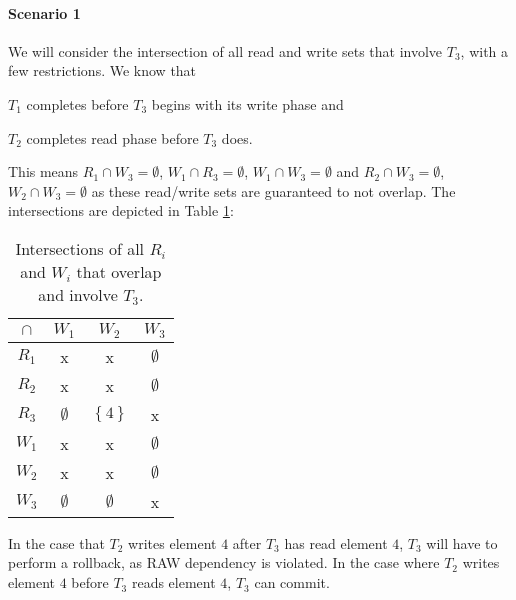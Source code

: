 \documentclass[11pt,a4paper,english]{article}
\begin{document}
\paragraph{Scenario 1}
We will consider the intersection of all read and write sets that involve
$T_{3}$, with a few restrictions. We know that \begin{inparaenum}[1)] \item
  $T_{1}$ completes before
$T_{3}$ begins with its write phase and \item $T_{2}$ completes read phase before
$T_{3}$ does.\end{inparaenum} This means $R_{1} \cap W_{3} = \emptyset$,
$W_{1} \cap R_{3} = \emptyset$, $W_{1} \cap W_{3} = \emptyset$ and
$R_{2} \cap W_{3} = \emptyset$, $W_{2} \cap W_{3} = \emptyset$ as these
read/write sets are guaranteed to not overlap. The intersections are depicted in
Table \ref{tbl:scenario1}:
\begin{table}[!hbt]
\centering
\begin{tabular}{|c|c|c|c|}
\hline
$\cap$  & $W_{1}$ & $W_{2}$ & $W_{3}$    \\ \hline
$R_{1}$ & x  & x  & $\emptyset$ \\ \hline
$R_{2}$ & x  & x  & $\emptyset$ \\ \hline
$R_{3}$ & $\emptyset$ & $\left\{ 4 \right\}$ & x \\ \hline
$W_{1}$ & x  & x  & $\emptyset$ \\ \hline
$W_{2}$ & x  & x  & $\emptyset$ \\ \hline
$W_{3}$ & $\emptyset$ & $\emptyset$ & x \\ \hline
\end{tabular}
\caption{Intersections of all $R_{i}$ and $W_{i}$ that overlap and involve $T_{3}$.}
\label{tbl:scenario1}
\end{table}

In the case that $T_{2}$ writes element $4$ after $T_{3}$ has read element $4$,
$T_{3}$ will have to perform a rollback, as RAW dependency is violated. In the
case where $T_{2}$ writes element $4$ before $T_{3}$ reads element $4$, $T_{3}$
can commit.
\end{document}

